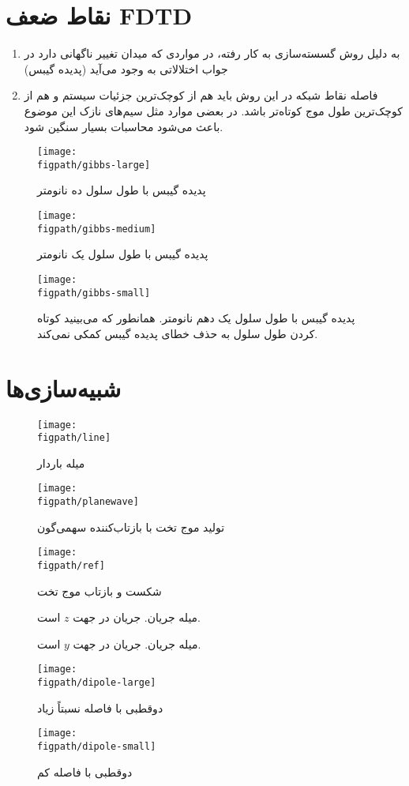 \documentclass[12pt,a4paper]{article}
\newcommand{\figpath}{../figures}
\newcommand{\figwidth}{0.9\linewidth}
\begin{document}
	\section{نقاط ضعف FDTD}
	\begin{enumerate}
		\item به دلیل روش گسسته‌سازی به کار رفته، در مواردی که میدان تغییر ناگهانی دارد در جواب اختلالاتی به وجود می‌آید (پدیده گیبس)
		\item فاصله نقاط شبکه در این روش باید هم از کوچک‌ترین جزئیات سیستم و هم از کوچک‌ترین طول موج کوتاه‌تر باشد.
		در بعضی موارد مثل سیم‌های نازک این موضوع باعث می‌شود محاسبات بسیار سنگین شود.
	\end{enumerate}
	\begin{figure}
		\centering
		\texttt{[image: \\figpath/gibbs-large]}
		\caption{پدیده گیبس با طول سلول ده نانومتر}
		\texttt{[image: \\figpath/gibbs-medium]}
		\caption{پدیده گیبس با طول سلول یک نانومتر}
	\end{figure}
	\begin{figure}
		\centering
		\texttt{[image: \\figpath/gibbs-small]}
		\caption{پدیده گیبس با طول سلول یک دهم نانومتر. همانطور که می‌بینید کوتاه کردن طول سلول به حذف خطای پدیده گیبس کمکی نمی‌کند.}
	\end{figure}
	\FloatBarrier\section{شبیه‌سازی‌ها}
	\begin{figure}[htb!]
		\centering
		\texttt{[image: \\figpath/line]}
		\caption{میله باردار}
	\end{figure}
	\begin{figure}
		\centering
		\texttt{[image: \\figpath/planewave]}
		\caption{تولید موج تخت با بازتاب‌کننده سهمی‌گون}
		\texttt{[image: \\figpath/ref]}
		\caption{شکست و بازتاب موج تخت}
	\end{figure}
	\begin{figure}
		\centering
		\caption{میله جریان. جریان در جهت $z$ است.}
		\caption{میله جریان. جریان در جهت $y$ است.}
	\end{figure}
	\restoregeometry
	\begin{figure}
		\centering
		\texttt{[image: \\figpath/dipole-large]}
		\caption{دوقطبی با فاصله نسبتاً زیاد}
		\texttt{[image: \\figpath/dipole-small]}
		\caption{دوقطبی با فاصله کم}
	\end{figure}
\end{document}

